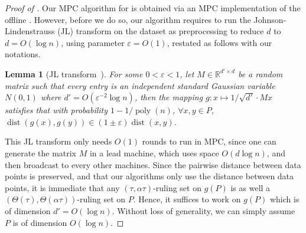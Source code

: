 \documentclass[11pt,letterpaper]{article}
\theoremstyle{plain}
\newtheorem{lemma}[theorem]{Lemma}
\theoremstyle{definition}
\theoremstyle{remark}
\DeclareMathOperator{\poly}{poly}
\DeclareMathOperator{\dist}{dist}
\renewcommand{\epsilon}{\ensuremath{\varepsilon}}
\let\epsilon\varepsilon
\begin{document}
\begin{proof}[Proof of ]
        Our MPC algorithm for  is obtained via an MPC implementation of the offline . 
        However, before we do so, our algorithm requires to run the
        Johnson-Lindenstrauss (JL) transform \cite{JL84} on the dataset as preprocessing to reduce $d$ to $d = O(\log n)$, using parameter $\epsilon = O(1)$, restated as follows with our notations.
        \begin{lemma}[JL transform~\cite{JL84}]
            For some $0 < \epsilon < 1$,
            let $M \in \mathbb{R}^{d' \times d}$ be a random matrix such that every entry is an independent standard Gaussian variable $N(0, 1)$ where $d' = O(\epsilon^{-2}\log n )$,
            then the mapping $g : x \mapsto 1 / \sqrt{d'} \cdot Mx$ satisfies that
            with probability $1 - 1 / \poly(n)$,
            $\forall x, y \in P$, $\dist(g(x), g(y))  \in (1 \pm \epsilon) \dist(x, y)$.
        \end{lemma}
        This JL transform only needs $O(1)$ rounds to run in MPC, since one can generate the matrix $M$ in a lead machine, which uses space $O(d \log n)$, and then broadcast to every other machines.
        Since the pairwise distance between data points is preserved, and that our algorithms only use the distance between data points,
        it is immediate that any $(\tau, \alpha \tau)$-ruling set on $g(P)$
        is as well a $(\Theta(\tau), \Theta(\alpha \tau))$-ruling set on $P$.
        Hence, it suffices to work on $g(P)$ which is of dimension $d' = O(\log n)$.
        Without loss of generality, we can simply assume $P$ is of dimension $O(\log n)$.



\end{proof}
\end{document}
